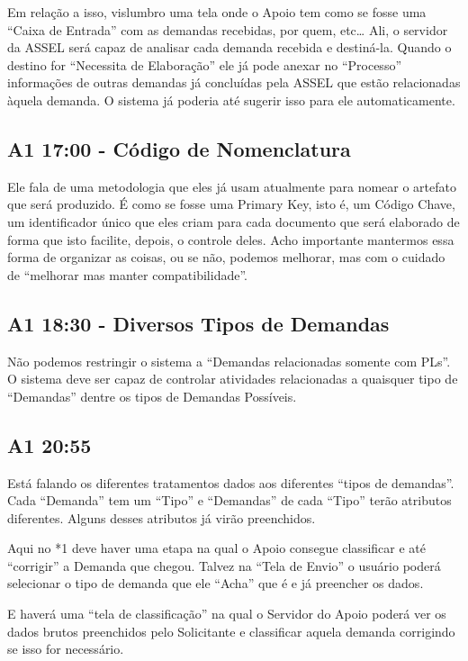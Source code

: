 	Em relação a isso, vislumbro uma tela onde o Apoio tem como se fosse uma “Caixa de Entrada” com as demandas recebidas, por quem, etc… Ali, o servidor da ASSEL será capaz de analisar cada demanda recebida e destiná-la. Quando o destino for “Necessita de Elaboração” ele já pode anexar no “Processo” informações de outras demandas já concluídas pela ASSEL que estão relacionadas àquela demanda. O sistema já poderia até sugerir isso para ele automaticamente.  

\subsection{A1 17:00 - Código de Nomenclatura}

	Ele fala de uma metodologia que eles já usam atualmente para nomear o artefato que será produzido. É como se fosse uma Primary Key, isto é, um Código Chave, um identificador único que eles criam para cada documento que será elaborado de forma que isto facilite, depois, o controle deles. Acho importante mantermos essa forma de organizar as coisas, ou se não, podemos melhorar, mas com o cuidado de “melhorar mas manter compatibilidade”.

\subsection{A1 18:30 - Diversos Tipos de Demandas}

Não podemos restringir o sistema a “Demandas relacionadas somente com PLs”. O sistema deve ser capaz de controlar atividades relacionadas a quaisquer tipo de “Demandas” dentre os tipos de Demandas Possíveis.

\subsection{A1 20:55}

Está falando os diferentes tratamentos dados aos diferentes “tipos de demandas”. Cada “Demanda” tem um “Tipo” e “Demandas” de cada “Tipo” terão atributos diferentes. Alguns desses atributos já virão preenchidos.

Aqui no *1 deve haver uma etapa na qual o Apoio consegue classificar e até “corrigir” a Demanda que chegou. Talvez na “Tela de Envio” o usuário poderá selecionar o tipo de demanda que ele “Acha” que é e já preencher os dados.

E haverá uma “tela de classificação” na qual o Servidor do Apoio poderá ver os dados brutos preenchidos pelo Solicitante e classificar aquela demanda corrigindo se isso for necessário. 


